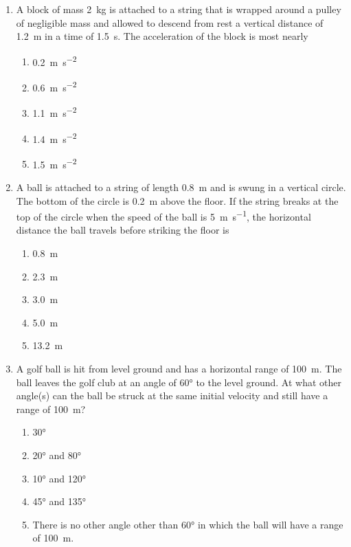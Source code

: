 \documentclass{../../../oss-apphys}
\begin{document}
\begin{multicols}{2}
\begin{enumerate}[resume,leftmargin=18pt]
  \item A block of mass \SI{2}{\kilo\gram} is attached to a string that is
    wrapped around a pulley of negligible mass and allowed to descend from rest
    a vertical distance of \SI{1.2}{\metre} in a time of \SI{1.5}{\second}. The
    acceleration of the block is most nearly
    \vspace{-.2in}
    \begin{enumerate}[nosep,leftmargin=18pt,label=(\Alph*)]
    \item\SI{0.2}{\metre\per\second\squared}
    \item\SI{.6} {\metre\per\second\squared}
    \item\SI{1.1}{\metre\per\second\squared}
    \item\SI{1.4}{\metre\per\second\squared}
    \item\SI{1.5}{\metre\per\second\squared}
    \end{enumerate}

  \item A ball is attached to a string of length \SI{.8}{\metre} and is swung
    in a vertical circle. The bottom of the circle is \SI{.2}{\metre} above the
    floor. If the string breaks at the top of the circle when the speed of the
    ball is \SI{5}{\metre\per\second}, the horizontal distance the ball travels
    before striking the floor is
    \vspace{-.2in}
    \begin{enumerate}[nosep,leftmargin=18pt,label=(\Alph*)]
    \item\SI{.8 }{\metre}
    \item\SI{2.3 }{\metre}
    \item\SI{3.0 }{\metre}
    \item\SI{5.0 }{\metre}
    \item\SI{13.2}{\metre}
    \end{enumerate}
    
  \item A golf ball is hit from level ground and has a horizontal range of
    \SI{100}{\metre}. The ball leaves the golf club at an angle of \ang{60} to
    the level ground. At what other angle(s) can the ball be struck at the same
    initial velocity and still have a range of \SI{100}{\metre}?
    \begin{center}
      \vspace{-.2in}
    \end{center}
    \begin{enumerate}[nosep,leftmargin=18pt,label=(\Alph*)]
    \item\ang{30}
    \item\ang{20} and \ang{80}
    \item\ang{10} and \ang{120}
    \item\ang{45} and \ang{135}
    \item There is no other angle other than \ang{60} in which the ball will
      have a range of \SI{100}{\metre}.
    \end{enumerate}
    

\end{enumerate}
\end{multicols}
\end{document}
